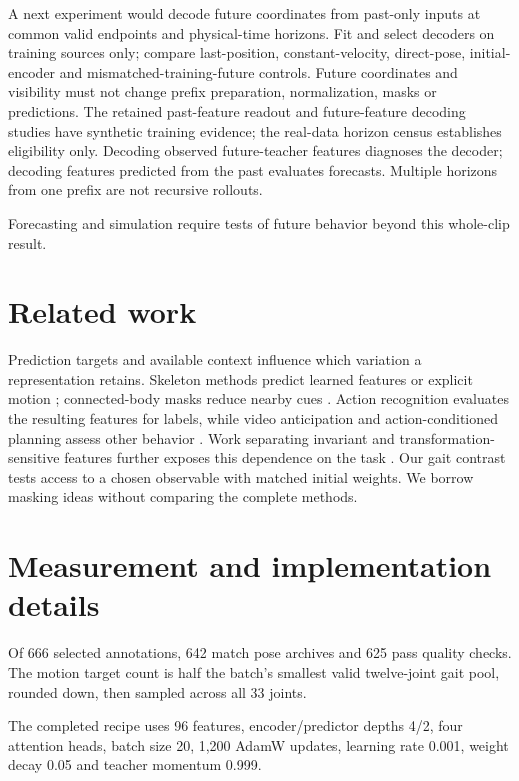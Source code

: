 \documentclass{article}
\begin{document}
A next experiment would decode future coordinates from past-only inputs
at common valid endpoints and physical-time horizons. Fit and select
decoders on training sources only; compare last-position,
constant-velocity, direct-pose, initial-encoder and
mismatched-training-future controls. Future coordinates and visibility
must not change prefix preparation, normalization, masks or predictions.
The retained past-feature readout and future-feature decoding studies
have synthetic training evidence; the real-data horizon census
establishes eligibility only. Decoding observed future-teacher features
diagnoses the decoder; decoding features predicted from the past
evaluates forecasts. Multiple horizons from one prefix are not recursive
rollouts.

Forecasting and simulation require tests of future behavior beyond this
whole-clip result.

\section{Related work}\label{related-work}

Prediction targets and available context influence which variation a
representation retains. Skeleton methods predict learned features
\citep{sjepa} or explicit motion \citep{mamp}; connected-body masks
reduce nearby cues \citep{slim}. Action recognition evaluates the
resulting features for labels, while video anticipation and
action-conditioned planning assess other behavior \citep{vjepa2}. Work
separating invariant and transformation-sensitive features further
exposes this dependence on the task \citep{seqjepa}. Our gait contrast
tests access to a chosen observable with matched initial weights. We
borrow masking ideas without comparing the complete methods.

\clearpage


\clearpage
\appendix
\section{Measurement and implementation
details}\label{measurement-and-implementation-details}

Of 666 selected annotations, 642 match pose archives and 625 pass
quality checks. The motion target count is half the batch's smallest
valid twelve-joint gait pool, rounded down, then sampled across all 33
joints.

The completed recipe uses 96 features, encoder/predictor depths 4/2,
four attention heads, batch size 20, 1,200 AdamW updates, learning rate
0.001, weight decay 0.05 and teacher momentum 0.999.
\end{document}
